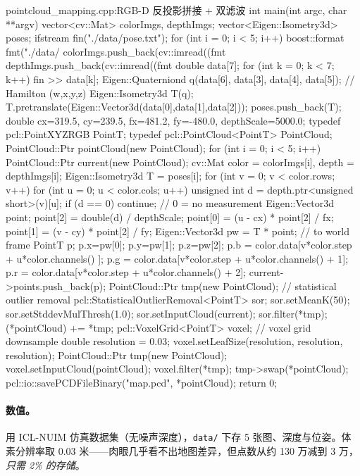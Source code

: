 \begin{codebox}[C++]{pointcloud\_mapping.cpp:RGB-D 反投影拼接 + 双滤波}
int main(int argc, char **argv) {
  vector<cv::Mat> colorImgs, depthImgs;
  vector<Eigen::Isometry3d> poses;
  ifstream fin("./data/pose.txt");
  for (int i = 0; i < 5; i++) {
    boost::format fmt("./data/%
    colorImgs.push_back(cv::imread((fmt %
    depthImgs.push_back(cv::imread((fmt %
    double data[7]; for (int k = 0; k < 7; k++) fin >> data[k];
    Eigen::Quaterniond q(data[6], data[3], data[4], data[5]); // Hamilton (w,x,y,z)
    Eigen::Isometry3d T(q); T.pretranslate(Eigen::Vector3d(data[0],data[1],data[2]));
    poses.push_back(T);
  }
  double cx=319.5, cy=239.5, fx=481.2, fy=-480.0, depthScale=5000.0;
  typedef pcl::PointXYZRGB PointT;
  typedef pcl::PointCloud<PointT> PointCloud;
  PointCloud::Ptr pointCloud(new PointCloud);
  for (int i = 0; i < 5; i++) {
    PointCloud::Ptr current(new PointCloud);
    cv::Mat color = colorImgs[i], depth = depthImgs[i];
    Eigen::Isometry3d T = poses[i];
    for (int v = 0; v < color.rows; v++)
    for (int u = 0; u < color.cols; u++) {
      unsigned int d = depth.ptr<unsigned short>(v)[u];
      if (d == 0) continue;                          // 0 = no measurement
      Eigen::Vector3d point;
      point[2] = double(d) / depthScale;
      point[0] = (u - cx) * point[2] / fx;
      point[1] = (v - cy) * point[2] / fy;
      Eigen::Vector3d pw = T * point;                // to world frame
      PointT p; p.x=pw[0]; p.y=pw[1]; p.z=pw[2];
      p.b = color.data[v*color.step + u*color.channels()    ];
      p.g = color.data[v*color.step + u*color.channels() + 1];
      p.r = color.data[v*color.step + u*color.channels() + 2];
      current->points.push_back(p);
    }
    PointCloud::Ptr tmp(new PointCloud);             // statistical outlier removal
    pcl::StatisticalOutlierRemoval<PointT> sor;
    sor.setMeanK(50); sor.setStddevMulThresh(1.0);
    sor.setInputCloud(current); sor.filter(*tmp);
    (*pointCloud) += *tmp;
  }
  pcl::VoxelGrid<PointT> voxel;                       // voxel grid downsample
  double resolution = 0.03;
  voxel.setLeafSize(resolution, resolution, resolution);
  PointCloud::Ptr tmp(new PointCloud);
  voxel.setInputCloud(pointCloud); voxel.filter(*tmp);
  tmp->swap(*pointCloud);
  pcl::io::savePCDFileBinary("map.pcd", *pointCloud);
  return 0;
}
\end{codebox}

\paragraph{数值。}
用 ICL-NUIM 仿真数据集（无噪声深度），\texttt{data/} 下存 5 张图、深度与位姿。体素分辨率取 0.03 米——肉眼几乎看不出地图差异，但点数从约 130 万减到 3 万，\emph{只需 2\% 的存储}\cite{gaoxiang2019slam14}。


